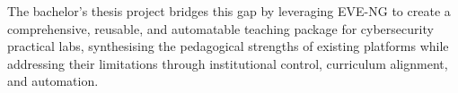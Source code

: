 The bachelor's thesis project bridges this gap by leveraging EVE-NG \cite{eve_ng} to create a
comprehensive, reusable, and automatable teaching package for cybersecurity practical labs,
synthesising the pedagogical strengths of existing platforms while addressing their limitations
through institutional control, curriculum alignment, and automation.


